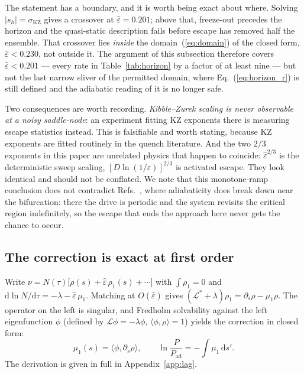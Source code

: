 \documentclass[%
 twocolumn,
 superscriptaddress,
 amsmath,amssymb,
 aps,
 pre,
 floatfix,
]{revtex4-2}
\newcommand{\dd}{\mathrm{d}}
\newcommand{\Leff}{\mathcal{L}}
\newcommand{\Sig}{\hat\varepsilon}
\begin{document}
The statement has a boundary, and it is worth being exact about where.  Solving $|s_h|=\sigma_{\mathrm{KZ}}$ gives a crossover at $\Sig=0.201$; above that, freeze-out precedes the horizon and the quasi-static description fails before escape has removed half the ensemble.  That crossover lies \emph{inside} the domain~(\ref{eq:domain}) of the closed form, $\Sig<0.230$, not outside it.  The argument of this subsection therefore covers $\Sig<0.201$ --- every rate in Table~\ref{tab:horizon} by a factor of at least nine --- but not the last narrow sliver of the permitted domain, where Eq.~(\ref{eq:horizon_r}) is still defined and the adiabatic reading of it is no longer safe.

Two consequences are worth recording.  \emph{Kibble--Zurek scaling is never observable at a noisy saddle-node}: an experiment fitting KZ exponents there is measuring escape statistics instead.  This is falsifiable and worth stating, because KZ exponents are fitted routinely in the quench literature.  And the two $2/3$ exponents in this paper are unrelated physics that happen to coincide: $\Sig^{2/3}$ is the deterministic sweep scaling, $[D\ln(1/\varepsilon)]^{2/3}$ is activated escape.  They look identical and should not be conflated.  We note that this monotone-ramp conclusion does not contradict Refs.~\cite{DykmanGoldingRyvkine2004,RyvkineDykmanGolding2004}, where adiabaticity does break down near the bifurcation: there the drive is periodic and the system revisits the critical region indefinitely, so the escape that ends the approach here never gets the chance to occur.

\subsection{The correction is exact at first order}

Write $\nu=N(\tau)\bigl[\rho(s)+\Sig\,\rho_1(s)+\cdots\bigr]$ with $\int\rho_1=0$ and $\dd\ln N/\dd\tau=-\lambda-\Sig\,\mu_1$.  Matching at $O(\Sig)$ gives $(\Leff^\ast+\lambda)\rho_1=\partial_s\rho-\mu_1\rho$.  The operator on the left is singular, and Fredholm solvability against the left eigenfunction $\phi$ (defined by $\Leff\phi=-\lambda\phi$, $\langle\phi,\rho\rangle=1$) yields the correction in closed form:
\begin{equation}
\label{eq:mu1}
\mu_1(s)=\langle\phi,\partial_s\rho\rangle,
\qquad
\ln\frac{P}{P_{\mathrm{ad}}}=-\int\mu_1\,\dd s' .
\end{equation}
The derivation is given in full in Appendix~\ref{app:lag}.
\end{document}
